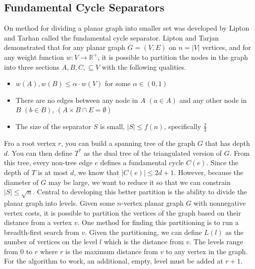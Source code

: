 \documentclass[12pt]{article}
\begin{document}


    \subsection{Fundamental Cycle Separators}
    \label{sec:graph-sep-fund-cycle-sep}


    On method for dividing a planar graph into smaller set was developed by Lipton and Tarhan called the fundamental cycle separator. Lipton and Tarjan demonstrated that for any planar graph $G = (V,E)$ on $n = |V|$ vertices, and for any weight function $w: V \rightarrow \mathbb{R}^+$, it is possible to partition the nodes in the graph into three sections $A, B, C, \subseteq V$ with the following qualities.
    \begin{itemize}
        \item $w(A), w(B) \leq \alpha \cdot w(V)$ for some $\alpha \in (0,1)$

        \item There are no edges between any node in $A$ $(a \in A)$ and any other node in $B$ $(b \in B)$, $(A \times B \cap E = \emptyset)$

        \item The size of the separator $S$ is small, $|S| \leq f(n)$, specifically $\frac{2}{3}$
    \end{itemize}

    Fro a root vertex $r$, you can build a spanning tree of the graph $G$ that has depth $d$. You can then define $T^*$ as the dual tree of the triangulated version of $G$. From this tree, every non-tree edge $e$ defines a fundamental cycle $C(e)$. Since the depth of $T$ is at most $d$, we know that $|C(e)| \leq 2d + 1$. However, because the diameter of $G$ may be large, we want to reduce it so that we can constrain $|S| \leq \sqrt{n}$. Central to developing this better partition is the ability to divide the planar graph into levels. Given some $n$-vertex planar graph $G$ with nonnegative vertex costs, it is possible to partition the vertices of the graph based on their distance from a vertex $v$. One method for finding this partitioning is to run a breadth-first search from $v$. Given the partitioning, we can define $L(l)$ as the number of vertices on the level $l$ which is the distance from $v$. The levels range from $0$ to $r$ where $r$ is the maximum distance from $v$ to any vertex in the graph. For the algorithm to work, an additional, empty, level must be added at $r+1$.
\end{document}

